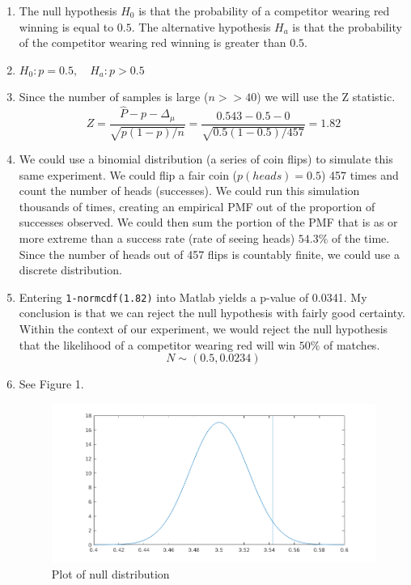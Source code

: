 \documentclass{article}
\begin{document}
\begin{enumerate}[label=\alph*.]
    \item The null hypothesis $H_0$ is that the probability of a competitor wearing red winning is equal to $0.5$. The alternative hypothesis $H_a$ is that the probability of the competitor wearing red winning is greater than $0.5$.
    \item $H_0: p = 0.5, \quad H_a: p > 0.5$
    \item Since the number of samples is large ($n>>40$) we will use the Z statistic. 
        $$Z = \frac{\hat{P} - p - \Delta_\mu}{\sqrt{p(1-p)/n}}=\frac{0.543 - 0.5 - 0}{\sqrt{0.5(1-0.5)/457}}=1.82$$
    \item We could use a binomial distribution (a series of coin flips) to simulate this same experiment. We could flip a fair coin ($p(heads)=0.5$) 457 times and count the number of heads (successes). We could run this simulation thousands of times, creating an empirical PMF out of the proportion of successes observed. We could then sum the portion of the PMF that is as or more extreme than a success rate (rate of seeing heads) $54.3\%$ of the time. Since the number of heads out of 457
        flips is countably finite, we could use a discrete distribution.
    \item Entering \texttt{1-normcdf(1.82)} into Matlab yields a p-value of 0.0341. My conclusion is that we can reject the null hypothesis with fairly good certainty. Within the context of our experiment, we would reject the null hypothesis that the likelihood of a competitor wearing red will win $50\%$ of matches.
        $$ N \sim(0.5, 0.0234)$$
    \item See Figure 1.
\begin{figure}
\begin{center}
    \includegraphics[scale=0.28]{fig1}
    \caption{Plot of null distribution}
\end{center}

\end{figure}
\end{enumerate}
\end{document}
